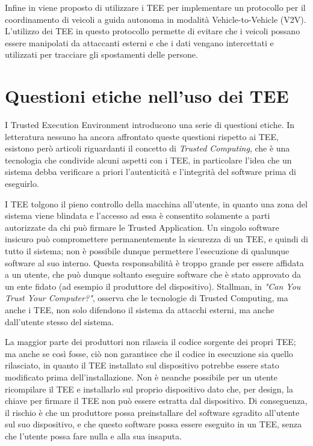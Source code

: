 \documentclass[12pt,italian]{report}
\begin{document}
Infine in \cite{teeuses_vehicles} viene proposto di utilizzare i TEE per
implementare un protocollo per il coordinamento di veicoli a guida
autonoma in modalità Vehicle-to-Vehicle (V2V).
L'utilizzo dei TEE in questo protocollo permette di evitare che i veicoli
possano essere manipolati da attaccanti esterni e che i dati vengano
intercettati e utilizzati per tracciare gli spostamenti delle persone. 

\section{Questioni etiche nell'uso dei TEE}
\label{sec:etica-tee}
I Trusted Execution Environment introducono una serie di questioni etiche.
In letteratura nessuno ha ancora affrontato queste questioni rispetto ai TEE,
esistono però articoli riguardanti il concetto di \textit{Trusted Computing},
che è una tecnologia che condivide alcuni aspetti con i TEE, in particolare
l'idea che un sistema debba verificare a priori l'autenticità e l'integrità
del software prima di eseguirlo.

I TEE tolgono il pieno controllo della macchina all'utente, in quanto una
zona del sistema viene blindata e l'accesso ad essa è consentito solamente
a parti autorizzate da chi può firmare le Trusted Application.
Un singolo software insicuro può compromettere permanentemente la sicurezza
di un TEE, e quindi di tutto il sistema; non è possibile dunque permettere
l'esecuzione di qualunque software al suo interno.
Questa responsabilità è troppo grande per essere affidata a un utente,
che può dunque soltanto eseguire software che è stato approvato da un
ente fidato (ad esempio il produttore del dispositivo).
Stallman, in \textit{"Can You Trust Your Computer?"}\cite{stallman2021tpm},
osserva che le tecnologie di Trusted Computing, ma anche i TEE, non solo
difendono il sistema da attacchi esterni, ma anche dall'utente stesso
del sistema.

La maggior parte dei produttori non rilascia il codice sorgente
dei propri TEE; ma anche se così fosse, ciò non garantisce che il codice
in esecuzione sia quello rilasciato, in quanto il TEE installato sul
dispositivo potrebbe essere stato modificato prima dell'installazione.
Non è neanche possibile per un utente ricompilare il TEE e installarlo
sul proprio dispositivo dato che, per design, la chiave per firmare
il TEE non può essere estratta dal dispositivo.
Di conseguenza, il rischio è che un produttore possa preinstallare del
software sgradito all'utente sul suo dispositivo, e che questo software
possa essere eseguito in un TEE, senza che l'utente possa fare nulla
e alla sua insaputa.
\end{document}
